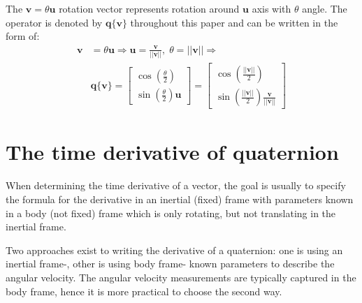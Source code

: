  The $\mathbf{v}=\theta\mathbf{u}$ rotation vector represents rotation around $\mathbf{u}$ axis with $\theta$ angle. The operator is denoted by $\mathbf{q}\{\mathbf{v}\}$ throughout this paper and can be written in the form of:
\begin{equation}
\begin{aligned}
    \mathbf{v}&=\theta\mathbf{u}\Rightarrow\mathbf{u}=\frac{\mathbf{v}}{||\mathbf{v}||},\;\theta=||\mathbf{v}||\Rightarrow\\&\mathbf{q}\{\mathbf{v} \}=\begin{bmatrix}
        \cos\left(\frac{\theta}{2}\right) \\ \sin\left(\frac{\theta}{2}\right)\mathbf{u}
    \end{bmatrix}=\begin{bmatrix}
        \cos\left(\frac{||\mathbf{v}||}{2}\right) \\
        \sin\left(\frac{||\mathbf{v}||}{2}\right)\frac{\mathbf{v}}{||\mathbf{v}||}
    \end{bmatrix}
\end{aligned}
\label{eq:rotvec2quat}
\end{equation}

\section{The time derivative of quaternion}
\label{app:time-der-of-quat}

When determining the time derivative of a vector, the goal is usually to specify the formula for the derivative in an inertial (fixed) frame with parameters known in a body (not fixed) frame which is only rotating, but not translating in the inertial frame.

Two approaches exist to writing the derivative of a quaternion: one is using an inertial frame-, other is using body frame- known parameters to describe the angular velocity. The angular velocity measurements are typically captured in the body frame, hence it is more practical to choose the second way. 

